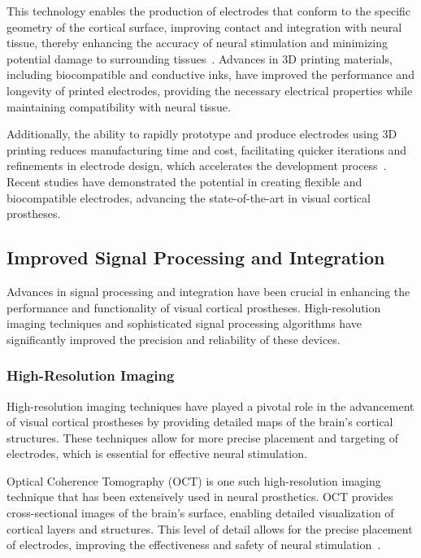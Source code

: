 \documentclass[twocolumn,10pt]{article}
\begin{document}
This technology enables the production of electrodes that conform to the
specific geometry of the cortical surface, improving contact and integration
with neural tissue, thereby enhancing the accuracy of neural stimulation and
minimizing potential damage to surrounding
tissues~\cite{liuSoftElasticHydrogelbased2019}. Advances in 3D printing
materials, including biocompatible and conductive inks, have improved the
performance and longevity of printed electrodes, providing the necessary
electrical properties while maintaining compatibility with neural tissue.

Additionally, the ability to rapidly prototype and produce electrodes using 3D
printing reduces manufacturing time and cost, facilitating quicker iterations
and refinements in electrode design, which accelerates the development
process~\cite{zhangClimbinginspiredTwiningElectrodes2019}. Recent studies have
demonstrated the potential in creating flexible and biocompatible electrodes,
advancing the state-of-the-art in visual cortical prostheses.

\subsection{Improved Signal Processing and Integration}
Advances in signal processing and integration have been crucial in enhancing the performance and functionality of visual cortical prostheses. High-resolution imaging techniques and sophisticated signal processing algorithms have significantly improved the precision and reliability of these devices.

\subsubsection*{High-Resolution Imaging}
High-resolution imaging techniques have played a pivotal role in the advancement
of visual cortical prostheses by providing detailed maps of the brain's cortical
structures. These techniques allow for more precise placement and targeting of
electrodes, which is essential for effective neural stimulation.

Optical Coherence Tomography (OCT) is one such high-resolution imaging technique
that has been extensively used in neural prosthetics. OCT provides
cross-sectional images of the brain's surface, enabling detailed visualization
of cortical layers and structures. This level of detail allows for the precise
placement of electrodes, improving the effectiveness and safety of neural
stimulation~\cite{xieUseOpticalCoherence2022}.
\end{document}
